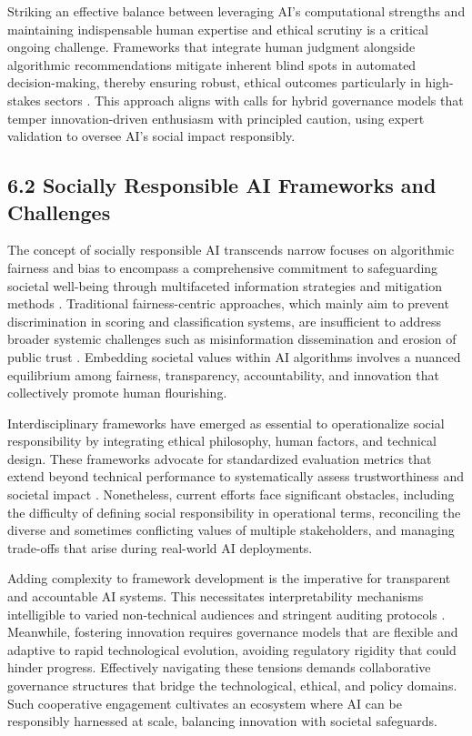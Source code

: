 \documentclass[11pt]{article}
\begin{document}
Striking an effective balance between leveraging AI’s computational strengths and maintaining indispensable human expertise and ethical scrutiny is a critical ongoing challenge. Frameworks that integrate human judgment alongside algorithmic recommendations mitigate inherent blind spots in automated decision-making, thereby ensuring robust, ethical outcomes particularly in high-stakes sectors \cite{ref2}. This approach aligns with calls for hybrid governance models that temper innovation-driven enthusiasm with principled caution, using expert validation to oversee AI’s social impact responsibly.

\subsection{6.2 Socially Responsible AI Frameworks and Challenges}

The concept of socially responsible AI transcends narrow focuses on algorithmic fairness and bias to encompass a comprehensive commitment to safeguarding societal well-being through multifaceted information strategies and mitigation methods \cite{ref26}. Traditional fairness-centric approaches, which mainly aim to prevent discrimination in scoring and classification systems, are insufficient to address broader systemic challenges such as misinformation dissemination and erosion of public trust \cite{ref36}. Embedding societal values within AI algorithms involves a nuanced equilibrium among fairness, transparency, accountability, and innovation that collectively promote human flourishing.

Interdisciplinary frameworks have emerged as essential to operationalize social responsibility by integrating ethical philosophy, human factors, and technical design. These frameworks advocate for standardized evaluation metrics that extend beyond technical performance to systematically assess trustworthiness and societal impact \cite{ref26}. Nonetheless, current efforts face significant obstacles, including the difficulty of defining social responsibility in operational terms, reconciling the diverse and sometimes conflicting values of multiple stakeholders, and managing trade-offs that arise during real-world AI deployments.

Adding complexity to framework development is the imperative for transparent and accountable AI systems. This necessitates interpretability mechanisms intelligible to varied non-technical audiences and stringent auditing protocols \cite{ref36}. Meanwhile, fostering innovation requires governance models that are flexible and adaptive to rapid technological evolution, avoiding regulatory rigidity that could hinder progress. Effectively navigating these tensions demands collaborative governance structures that bridge the technological, ethical, and policy domains. Such cooperative engagement cultivates an ecosystem where AI can be responsibly harnessed at scale, balancing innovation with societal safeguards.
\end{document}
